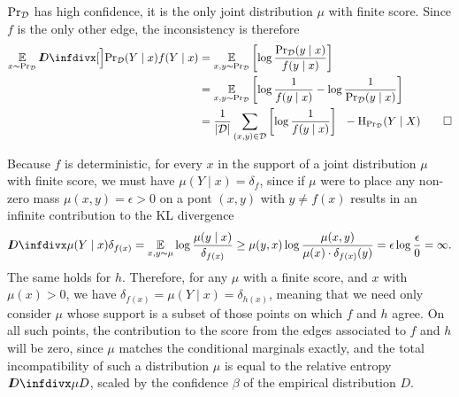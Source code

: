 \begin{subappendices}
\begin{lproof} \label{proof:supervised-cross-entropy}
	$\Pr\nolimits_{{\mathcal D}}$ has high confidence, it is the only joint distribution $\mu$ with finite score. Since $f$ is the only other edge, the inconsistency is therefore
	\begin{align*}
	\Ex_{x \sim \datadist\xysamp} \kldiv[\Big]{\datadist\xysamp(Y\mid x)}{f(Y\mid x)}
		&= \Ex_{x,y \sim \datadist\xysamp} \left[\log \frac{\datadist\xysamp(y\mid x)}{f(y\mid x)}\right]\\
		&= \Ex_{x,y \sim \datadist\xysamp} \left[ \log \frac{1}{f(y\mid x)} - \log \frac{1}{\datadist\xysamp(y\mid x)} \right] \\
		&= \frac1{|\xysamp|}\sum_{(x,y) \in \xysamp} \left[\log \frac1{f(y \mid x)}\right] ~~- \H_{\datadist\xysamp}(Y\mid X)\qedhere
	\end{align*}
\end{lproof}

\begin{lproof}\label{proof:accuracy}
	Because $f$ is deterministic, for every $x$ in the support of a joint distribution $\mu$ with finite score, we must have $\mu(Y\mid x) = \delta_f$, since if $\mu$ were to place any non-zero mass $\mu(x,y) = \epsilon > 0$  on a pont $(x,y)$ with $y \ne f(x)$ results in an infinite contribution to the KL divergence
	\[ \kldiv{\mu(Y\mid x)}{\delta_{f(x)}} =
	 	\Ex_{x,y \sim \mu} \log \frac{\mu(y\mid x)}{\delta_{f(x)}} \ge \mu(y,x) \log \frac{\mu(x,y)}{\mu(x) \cdot \delta_{f(x)}(y)} =  \epsilon \log \frac{\epsilon}{0} = \infty.
	\]
	The same holds for $h$. Therefore, for any $\mu$ with a finite score, and $x$ with $\mu(x) > 0$, we have $\delta_{f(x)} = \mu(Y\mid x) =  \delta_{h(x)}$, meaning that we need only consider $\mu$ whose support is a subset of those points on which $f$ and $h$ agree.
	On all such points, the contribution to the score from the edges associated to $f$ and $h$ will be zero, since $\mu$ matches the conditional marginals exactly, and the total incompatibility of such a distribution $\mu$ is equal to the relative entropy $\kldiv{\mu}{D}$, scaled by the confidence $\beta$ of the empirical distribution $D$.


\end{lproof}
\end{subappendices}
